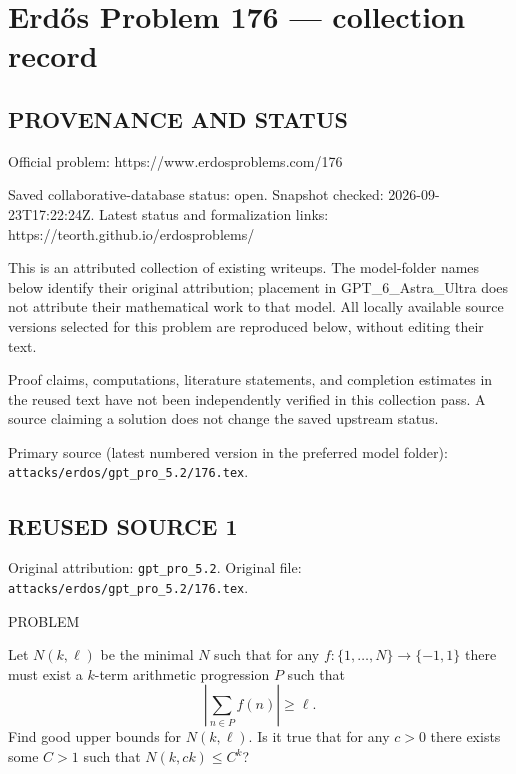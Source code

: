 \section*{Erd\H{o}s Problem 176 --- collection record}

\subsection*{PROVENANCE AND STATUS}
Official problem: https://www.erdosproblems.com/176

Saved collaborative-database status: open.
Snapshot checked: 2026-09-23T17:22:24Z.
Latest status and formalization links: https://teorth.github.io/erdosproblems/

This is an attributed collection of existing writeups. The model-folder names below identify their original attribution; placement in GPT\_6\_Astra\_Ultra does not attribute their mathematical work to that model. All locally available source versions selected for this problem are reproduced below, without editing their text.

Proof claims, computations, literature statements, and completion estimates in the reused text have not been independently verified in this collection pass. A source claiming a solution does not change the saved upstream status.

Primary source (latest numbered version in the preferred model folder): \texttt{attacks/erdos/gpt\_pro\_5.2/176.tex}.

\subsection*{REUSED SOURCE 1}
Original attribution: \texttt{gpt\_pro\_5.2}.
Original file: \texttt{attacks/erdos/gpt\_pro\_5.2/176.tex}.


PROBLEM

Let $N(k,\ell)$ be the minimal $N$ such that for any $f:\{1,\ldots,N\}\to\{-1,1\}$ there must exist a $k$-term arithmetic progression $P$ such that
\[ \left\lvert \sum_{n\in P}f(n)\right\rvert\geq \ell.\]
Find good upper bounds for $N(k,\ell)$. Is it true that for any $c>0$ there exists some $C>1$ such that $N(k,ck)\leq C^k$?

